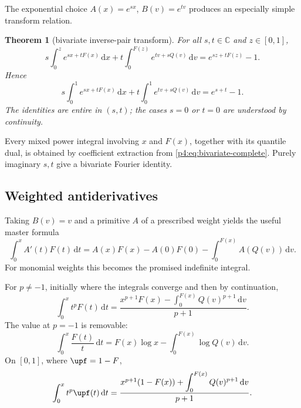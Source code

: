 \documentclass[11pt,oneside]{article}
\newtheorem{theorem}{Theorem}[section]
\theoremstyle{definition}
\theoremstyle{remark}
\newcommand{\F}{F}
\newcommand{\Q}{Q}
\newcommand{\C}{\mathbb C}
\newcommand{\dd}{\,\mathrm d}
\newcommand{\1}{\mathbf 1}
\begin{document}
The exponential choice \(A(x)=e^{sx}\), \(B(v)=e^{tv}\) produces an especially
simple transform relation.

\begin{theorem}[bivariate inverse-pair transform]\label{p4:thm:bivariate-exp}
For all \(s,t\in\C\) and \(z\in[0,1]\),
\begin{equation}\label{p4:eq:bivariate-incomplete}
 s\int_0^z e^{sx+t\F(x)}\dd x
 +t\int_0^{\F(z)}e^{tv+s\Q(v)}\dd v
 =e^{sz+t\F(z)}-1.
\end{equation}
Hence
\begin{equation}\label{p4:eq:bivariate-complete}
 s\int_0^1e^{sx+t\F(x)}\dd x
 +t\int_0^1e^{tv+s\Q(v)}\dd v
 =e^{s+t}-1.
\end{equation}
The identities are entire in \((s,t)\); the cases \(s=0\) or \(t=0\) are understood
by continuity.
\end{theorem}

Every mixed power integral involving \(x\) and \(\F(x)\), together with its quantile
dual, is obtained by coefficient extraction from \cref{p4:eq:bivariate-complete}.  Purely
imaginary \(s,t\) give a bivariate Fourier identity.

\subsection{Weighted antiderivatives}

Taking \(B(v)=v\) and a primitive \(A\) of a prescribed weight yields the useful
master formula
\begin{equation}\label{p4:eq:weighted-antiderivative-master}
 \int_0^x A'(t)\F(t)\dd t
 =A(x)\F(x)-A(0)\F(0)-\int_0^{\F(x)}A(\Q(v))\dd v.
\end{equation}
For monomial weights this becomes the promised indefinite integral.

\begin{corollary}\label{p4:cor:monomial-F}
For \(p\ne-1\), initially where the integrals converge and then by continuation,
\begin{equation}\label{p4:eq:monomial-F-antiderivative}
 \int_0^x t^p\F(t)\dd t
 =\frac{x^{p+1}\F(x)-\displaystyle\int_0^{\F(x)}\Q(v)^{p+1}\dd v}{p+1}.
\end{equation}
The value at \(p=-1\) is removable:
\begin{equation}\label{p4:eq:F-over-x-incomplete}
 \int_0^x\frac{\F(t)}t\dd t
 =\F(x)\log x-\int_0^{\F(x)}\log\Q(v)\dd v.
\end{equation}
On \([0,1]\), where \(\upf=1-\F\),
\begin{equation}\label{p4:eq:monomial-up-half-antiderivative}
 \int_0^x t^p\upf(t)\dd t
 =\frac{x^{p+1}(1-\F(x))+\displaystyle\int_0^{\F(x)}\Q(v)^{p+1}\dd v}{p+1}.
\end{equation}
\end{corollary}
\end{document}
